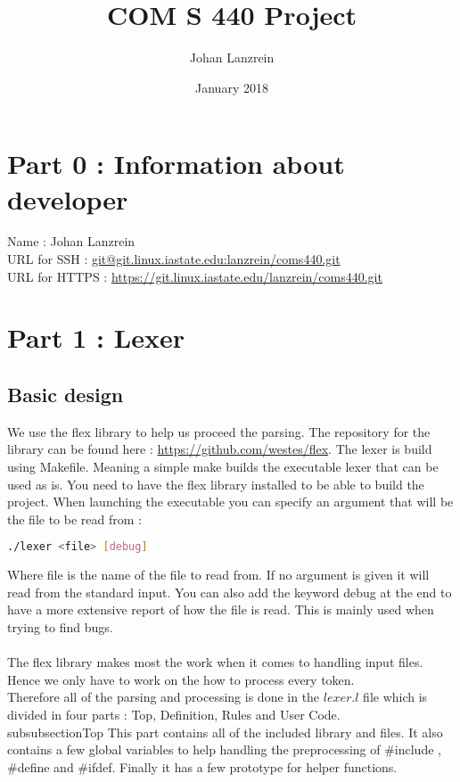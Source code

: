 \documentclass{article}
\title{COM S 440 Project}
\author{Johan Lanzrein}
\date{January 2018}
\begin{document}
\maketitle

\section{Part 0 : Information about developer}

Name : Johan Lanzrein \\
URL for SSH : \url{git@git.linux.iastate.edu:lanzrein/coms440.git} \\
URL for HTTPS : \url{https://git.linux.iastate.edu/lanzrein/coms440.git}



\section{Part 1 : Lexer}
\subsection{Basic design}
We use the flex library to help us proceed the parsing. The repository for the library can be found here : \url{https://github.com/westes/flex}. The lexer is build using Makefile. Meaning a simple make builds the executable lexer that can be used as is. You need to have the flex library installed to be able to build the project. 
When launching the executable you can specify an argument that will be the file to be read from :  \begin{lstlisting}[language=bash]
./lexer <file> [debug]
\end{lstlisting}
Where file is the name of the file to read from. If no argument is given it will read from the standard input. You can also add the keyword debug at the end to have a more extensive report of how the file is read. This is mainly used when trying to find bugs. \\ \\
The flex library makes most the work when it comes to handling input files. Hence we only have to work on the how to process every token. \\ Therefore all of the parsing and processing is done in the $lexer.l$ file which is divided in four parts : Top, Definition, Rules and User Code.
\\subsubsection{Top}
This part contains all of the included library and files. 
It also contains a few global variables to help handling the preprocessing of \#include , \#define and \#ifdef. 
Finally it has a few prototype for helper functions. 
\end{document}
